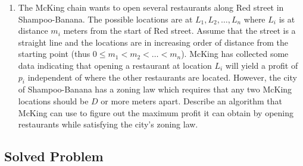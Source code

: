 \documentclass[11pt]{article}
\def\Sym#1{\texttt{\upshape\textcolor{BrickRed}{#1}}}
\def\Cdot{\mathbin{\text{\normalfont \textbullet}}}
\begin{document}
\begin{enumerate}
Describe and analyze an efficient algorithm that given
a string $w$ and an integer $k$ decides whether $w$ can be
split into palindromes each of which is of length at least $k$. For example,
given the input string \Sym{BUBBASEESABANANA} and $3$
your algorithm would answer yes because one can find a split 
$\Sym{BUB} \Cdot \Sym{BASEESAB} \Cdot \Sym{ANANA}$. The answer should be
no if we set $k=4$. Note that the answer is always yes for $k=1$.

\item    The McKing chain wants to open several restaurants along Red street
  in Shampoo-Banana. The possible locations are at $L_1,L_2, \ldots,
  L_n$ where $L_i$ is at distance $m_i$ meters from the start of Red
  street. Assume that the street is a straight line and the locations
  are in increasing order of distance from the starting point (thus $0
  \leq m_1 < m_2 < \ldots < m_n$). McKing has collected some data
  indicating that opening a restaurant at location $L_i$ will yield a
  profit of $p_i$ independent of where the other restaurants are
  located. However, the city of Shampoo-Banana has a zoning law which
  requires that any two McKing locations should be $D$ or more meters
  apart. Describe an algorithm that McKing can use to figure out the
  maximum profit it can obtain by opening restaurants while
  satisfying the city's zoning law.


\end{enumerate}
\vspace{1in}


\subsection*{Solved Problem}
\end{document}
